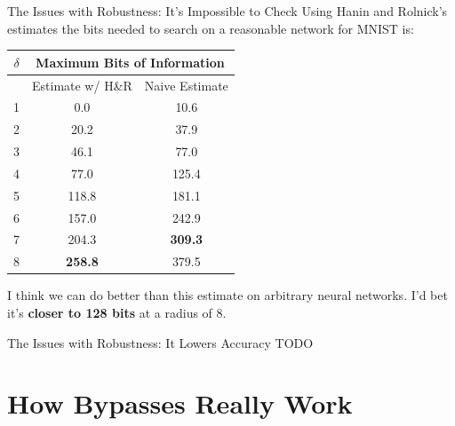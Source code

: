 \documentclass{beamer}
\begin{document}
\begin{frame}{The Issues with Robustness: It's Impossible to Check}
    Using Hanin and Rolnick's estimates the bits needed to search on a reasonable network for MNIST is:
    \begin{center}
        \begin{tabular}{| c || c | c |}
            \hline
            $\delta$ & \multicolumn{2}{|c|}{Maximum Bits of Information} \\
            \hline
            & Estimate w/ H\&R & Naive Estimate \\
            \hline
                1 & 0.0 & 10.6 \\
                2 & 20.2 & 37.9 \\
                3 & 46.1 & 77.0 \\
                4 & 77.0 & 125.4 \\
                5 & 118.8 & 181.1 \\
                6 & 157.0 & 242.9 \\
                7 & 204.3 & \textbf{309.3} \\
                8 & \textbf{258.8} & 379.5 \\
            \hline
        \end{tabular}
        \vspace{10pt}

        I think we can do better than this estimate on arbitrary neural networks. I'd bet it's \textbf{closer to 128 bits} at a radius of 8.
    \end{center}
\end{frame}

\begin{frame}{The Issues with Robustness: It Lowers Accuracy}
    TODO
\end{frame}


\section{How Bypasses Really Work}
\end{document}
